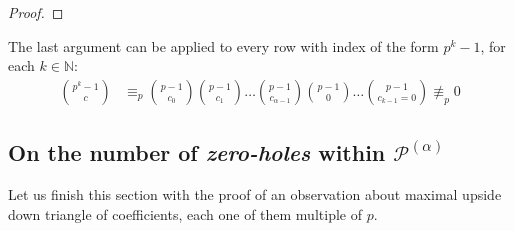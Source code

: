 \begin{proof}

\end{proof}

  The 
  last argument can be applied to every row with index of
  the form $p^k -1$, for each $k\in\mathbb{N}$:
  \begin{displaymath}
    \begin{split}
      {{p^k-1} \choose {c}} &\equiv_{p} {{p-1} \choose {c_0}} {{p-1} \choose {c_1}} \ldots 
      {{p-1} \choose {c_{{\alpha}-1}}}{{p-1} \choose {0}}\ldots{{p-1} \choose {c_{k-1}=0}} \not\equiv_{p} 0
    \end{split}
  \end{displaymath}

\subsection{On the number of \emph{zero-holes} within $\mathcal{P}^{(\alpha)}$}

Let us finish this section with the proof of an observation about
maximal upside down triangle of coefficients, each one of them 
multiple of $p$.

